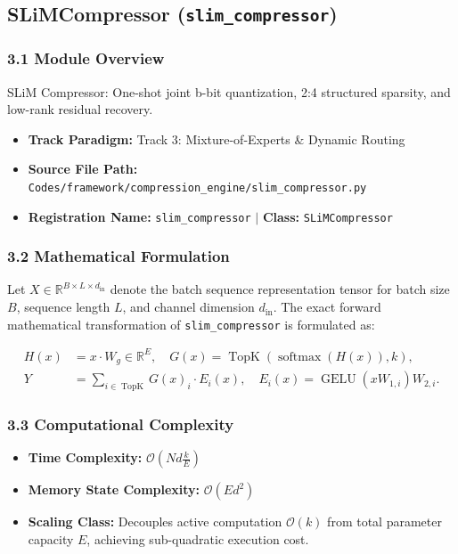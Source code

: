 \subsection{SLiMCompressor (\texttt{slim\_compressor})}
\label{sec:app_module_slim_compressor}

\subsubsection*{3.1 Module Overview}
SLiM Compressor: One-shot joint b-bit quantization, 2:4 structured sparsity, and low-rank residual recovery.
\begin{itemize}
    \item \textbf{Track Paradigm:} Track 3: Mixture-of-Experts & Dynamic Routing
    \item \textbf{Source File Path:} \texttt{Codes/framework/compression\_engine/slim\_compressor.py}
    \item \textbf{Registration Name:} \texttt{slim\_compressor} $\mid$ \textbf{Class:} \texttt{SLiMCompressor}
\end{itemize}

\subsubsection*{3.2 Mathematical Formulation}
Let $X \in \mathbb{R}^{B \times L \times d_{\text{in}}}$ denote the batch sequence representation tensor for batch size $B$, sequence length $L$, and channel dimension $d_{\text{in}}$. The exact forward mathematical transformation of \texttt{slim\_compressor} is formulated as:

\begin{align}
H(x) &= x \cdot W_g \in \mathbb{R}^{E}, \quad G(x) = \operatorname{TopK}\left(\operatorname{softmax}(H(x)), k\right), \\
Y &= \sum_{i \in \operatorname{TopK}} G(x)_i \cdot E_i(x), \quad E_i(x) = \operatorname{GELU}(x W_{1, i}) W_{2, i}.
\end{align}


\subsubsection*{3.3 Computational Complexity}
\begin{itemize}
    \item \textbf{Time Complexity:} $\mathcal{O}(N d \frac{k}{E})$
    \item \textbf{Memory State Complexity:} $\mathcal{O}(E d^2)$
    \item \textbf{Scaling Class:} Decouples active computation $\mathcal{O}(k)$ from total parameter capacity $E$, achieving sub-quadratic execution cost.
\end{itemize}

